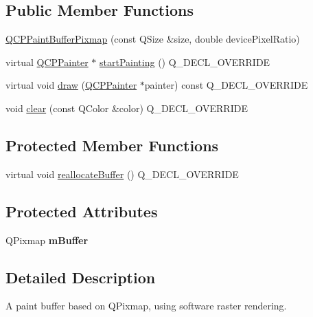 \subsection*{Public Member Functions}
\begin{DoxyCompactItemize}
\item 
\hyperlink{classQCPPaintBufferPixmap_aef0224e03b9285509391fcd61a8e6844}{Q\+C\+P\+Paint\+Buffer\+Pixmap} (const Q\+Size \&size, double device\+Pixel\+Ratio)
\item 
virtual \hyperlink{classQCPPainter}{Q\+C\+P\+Painter} $\ast$ \hyperlink{classQCPPaintBufferPixmap_a357964ef7d28cfa530338be4e5c93234}{start\+Painting} () Q\+\_\+\+D\+E\+C\+L\+\_\+\+O\+V\+E\+R\+R\+I\+DE
\item 
virtual void \hyperlink{classQCPPaintBufferPixmap_af7bfc685e56a0a9329e57cd9a265eb74}{draw} (\hyperlink{classQCPPainter}{Q\+C\+P\+Painter} $\ast$painter) const Q\+\_\+\+D\+E\+C\+L\+\_\+\+O\+V\+E\+R\+R\+I\+DE
\item 
void \hyperlink{classQCPPaintBufferPixmap_a14badbd010a3cde6b55817ccb7b65217}{clear} (const Q\+Color \&color) Q\+\_\+\+D\+E\+C\+L\+\_\+\+O\+V\+E\+R\+R\+I\+DE
\end{DoxyCompactItemize}
\subsection*{Protected Member Functions}
\begin{DoxyCompactItemize}
\item 
virtual void \hyperlink{classQCPPaintBufferPixmap_ad49f3205ba3463b1c44f8db3cfcc90f0}{reallocate\+Buffer} () Q\+\_\+\+D\+E\+C\+L\+\_\+\+O\+V\+E\+R\+R\+I\+DE
\end{DoxyCompactItemize}
\subsection*{Protected Attributes}
\begin{DoxyCompactItemize}
\item 
Q\+Pixmap {\bfseries m\+Buffer}\hypertarget{classQCPPaintBufferPixmap_a6d7009f45f03e305f2dc00e52a9225f8}{}\label{classQCPPaintBufferPixmap_a6d7009f45f03e305f2dc00e52a9225f8}

\end{DoxyCompactItemize}


\subsection{Detailed Description}
A paint buffer based on Q\+Pixmap, using software raster rendering. 

